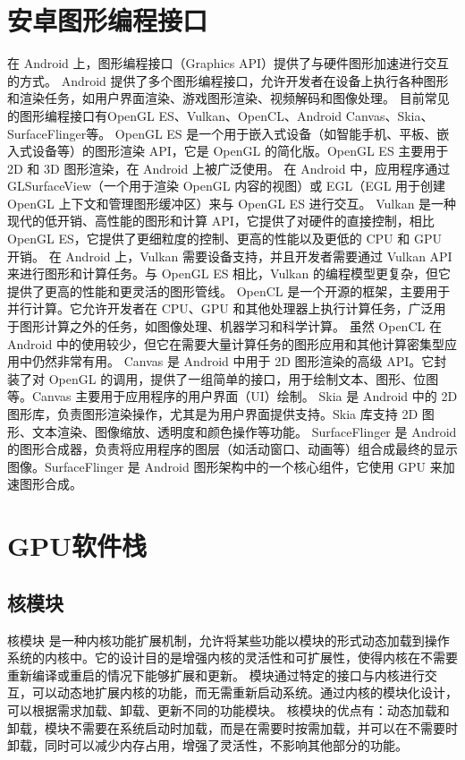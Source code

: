 \section{安卓图形编程接口}
在 Android 上，图形编程接口（Graphics API）提供了与硬件图形加速进行交互的方式。
Android 提供了多个图形编程接口，允许开发者在设备上执行各种图形和渲染任务，如用户界面渲染、游戏图形渲染、视频解码和图像处理。
目前常见的图形编程接口有OpenGL ES、Vulkan、OpenCL、Android Canvas、Skia、SurfaceFlinger等。
OpenGL ES 是一个用于嵌入式设备（如智能手机、平板、嵌入式设备等）的图形渲染 API，它是 OpenGL 的简化版。OpenGL ES 主要用于 2D 和 3D 图形渲染，在 Android 上被广泛使用。
在 Android 中，应用程序通过 GLSurfaceView（一个用于渲染 OpenGL 内容的视图）或 EGL（EGL 用于创建 OpenGL 上下文和管理图形缓冲区）来与 OpenGL ES 进行交互。
Vulkan 是一种现代的低开销、高性能的图形和计算 API，它提供了对硬件的直接控制，相比 OpenGL ES，它提供了更细粒度的控制、更高的性能以及更低的 CPU 和 GPU 开销。
在 Android 上，Vulkan 需要设备支持，并且开发者需要通过 Vulkan API 来进行图形和计算任务。与 OpenGL ES 相比，Vulkan 的编程模型更复杂，但它提供了更高的性能和更灵活的图形管线。
OpenCL 是一个开源的框架，主要用于并行计算。它允许开发者在 CPU、GPU 和其他处理器上执行计算任务，广泛用于图形计算之外的任务，如图像处理、机器学习和科学计算。
虽然 OpenCL 在 Android 中的使用较少，但它在需要大量计算任务的图形应用和其他计算密集型应用中仍然非常有用。
Canvas 是 Android 中用于 2D 图形渲染的高级 API。它封装了对 OpenGL 的调用，提供了一组简单的接口，用于绘制文本、图形、位图等。Canvas 主要用于应用程序的用户界面（UI）绘制。
Skia 是 Android 中的 2D 图形库，负责图形渲染操作，尤其是为用户界面提供支持。Skia 库支持 2D 图形、文本渲染、图像缩放、透明度和颜色操作等功能。
SurfaceFlinger 是 Android 的图形合成器，负责将应用程序的图层（如活动窗口、动画等）组合成最终的显示图像。SurfaceFlinger 是 Android 图形架构中的一个核心组件，它使用 GPU 来加速图形合成。

\section{GPU软件栈}
\subsection{核模块}
核模块 是一种内核功能扩展机制，允许将某些功能以模块的形式动态加载到操作系统的内核中。它的设计目的是增强内核的灵活性和可扩展性，使得内核在不需要重新编译或重启的情况下能够扩展和更新。
模块通过特定的接口与内核进行交互，可以动态地扩展内核的功能，而无需重新启动系统。通过内核的模块化设计，可以根据需求加载、卸载、更新不同的功能模块。
核模块的优点有：动态加载和卸载，模块不需要在系统启动时加载，而是在需要时按需加载，并可以在不需要时卸载，同时可以减少内存占用，增强了灵活性，不影响其他部分的功能。

